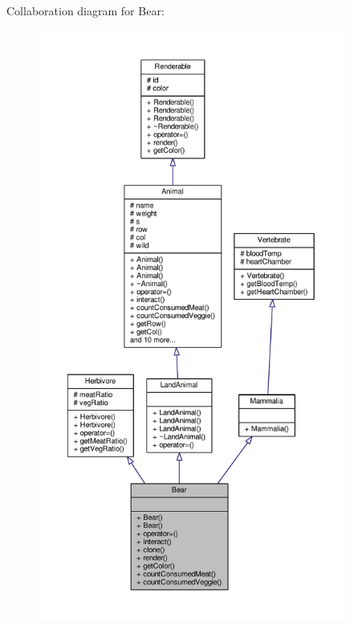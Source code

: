 Collaboration diagram for Bear\+:
\nopagebreak
\begin{figure}[H]
\begin{center}
\leavevmode
\includegraphics[height=550pt]{classBear__coll__graph}
\end{center}
\end{figure}
